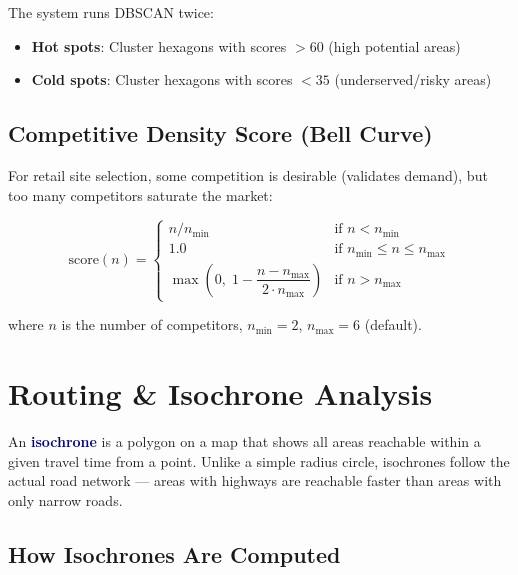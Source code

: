 \documentclass[12pt, a4paper]{article}
\newcommand{\concept}[1]{\textbf{\textcolor{darkblue}{#1}}}
\begin{document}
The system runs DBSCAN twice:
\begin{itemize}[leftmargin=2em]
    \item \textbf{Hot spots}: Cluster hexagons with scores $> 60$ (high potential areas)
    \item \textbf{Cold spots}: Cluster hexagons with scores $< 35$ (underserved/risky areas)
\end{itemize}

\subsection{Competitive Density Score (Bell Curve)}

For retail site selection, some competition is desirable (validates demand),
but too many competitors saturate the market:

\begin{equation}
    \text{score}(n) =
    \begin{cases}
        n / n_{\min} & \text{if } n < n_{\min} \\
        1.0 & \text{if } n_{\min} \leq n \leq n_{\max} \\
        \max\!\left(0,\; 1 - \dfrac{n - n_{\max}}{2 \cdot n_{\max}}\right) & \text{if } n > n_{\max}
    \end{cases}
\end{equation}

where $n$ is the number of competitors, $n_{\min} = 2$, $n_{\max} = 6$ (default).

\newpage

\section{Routing \& Isochrone Analysis}

An \concept{isochrone} is a polygon on a map that shows all areas reachable within a
given travel time from a point. Unlike a simple radius circle, isochrones follow the
actual road network — areas with highways are reachable faster than areas with only
narrow roads.

\subsection{How Isochrones Are Computed}
\end{document}

